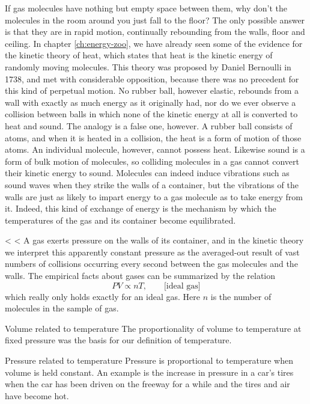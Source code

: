 If gas molecules have nothing but empty space between them,
why don't the molecules in the room around you just fall to
the floor? The only possible answer is that they are in
rapid motion, continually rebounding from the walls, floor
and ceiling. In chapter \ref{ch:energy-zoo},
we have already seen some of the evidence for
the kinetic theory of heat, which states that heat is the kinetic energy of
randomly moving molecules. This theory was proposed by
Daniel Bernoulli in 1738, and met with considerable opposition, because
there was no precedent for this kind of
perpetual motion. No rubber ball, however elastic, rebounds
from a wall with exactly as much energy as it originally
had, nor do we ever observe a collision between balls in
which none of the kinetic energy at all is converted to heat
and sound. The analogy is a false one, however. A rubber
ball consists of atoms, and when it is heated in a
collision, the heat is a form of motion of those atoms. An
individual molecule, however, cannot possess heat. Likewise
sound is a form of bulk motion of molecules, so colliding
molecules in a gas cannot convert their kinetic energy to
sound. Molecules can indeed induce vibrations such as sound
waves when they strike the walls of a container, but the
vibrations of the walls are just as likely to impart energy
to a gas molecule as to take energy from it. Indeed, this
kind of exchange of energy is the mechanism by which the
temperatures of the gas and its container become
equilibrated.

<%
<%
A gas exerts pressure on the walls of its container, and in
the kinetic theory we interpret this apparently constant
pressure as the averaged-out result of vast numbers of
collisions occurring every second between the gas molecules
and the walls. The empirical facts about gases can be
summarized by the relation
\begin{equation*}
        PV \propto nT   , \qquad \text{[ideal gas]}
\end{equation*}
which really only holds exactly for an ideal gas. Here $n$ is
the number of molecules in the sample of gas.

\begin{eg}{Volume related to temperature}
The proportionality of volume to temperature at fixed
pressure was the basis for our definition of temperature.
\end{eg}

\begin{eg}{Pressure related to temperature}
Pressure is proportional to temperature when volume is held
constant. An example is the increase in pressure in a car's
tires when the car has been driven on the freeway for a
while and the tires and air have become hot.
\end{eg}

